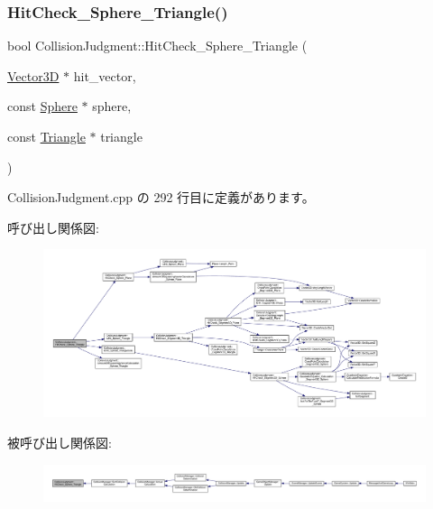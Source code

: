 \subsubsection{\texorpdfstring{Hit\+Check\+\_\+\+Sphere\+\_\+\+Triangle()}{HitCheck\_Sphere\_Triangle()}}
{\footnotesize\ttfamily bool Collision\+Judgment\+::\+Hit\+Check\+\_\+\+Sphere\+\_\+\+Triangle (\begin{DoxyParamCaption}\item[{\mbox{\hyperlink{class_vector3_d}{Vector3D}} $\ast$}]{hit\+\_\+vector,  }\item[{const \mbox{\hyperlink{class_sphere}{Sphere}} $\ast$}]{sphere,  }\item[{const \mbox{\hyperlink{class_triangle}{Triangle}} $\ast$}]{triangle }\end{DoxyParamCaption})\hspace{0.3cm}{\ttfamily [static]}}



 Collision\+Judgment.\+cpp の 292 行目に定義があります。

呼び出し関係図\+:\nopagebreak
\begin{figure}[H]
\begin{center}
\leavevmode
\includegraphics[width=350pt]{class_collision_judgment_a2b4e851cf1fc45dca09175b36fb4f50c_cgraph}
\end{center}
\end{figure}
被呼び出し関係図\+:
\nopagebreak
\begin{figure}[H]
\begin{center}
\leavevmode
\includegraphics[width=350pt]{class_collision_judgment_a2b4e851cf1fc45dca09175b36fb4f50c_icgraph}
\end{center}
\end{figure}
\mbox{\label{class_collision_judgment_ab33b8936e62bdb9b6cf6f3d383c033b9}} 

